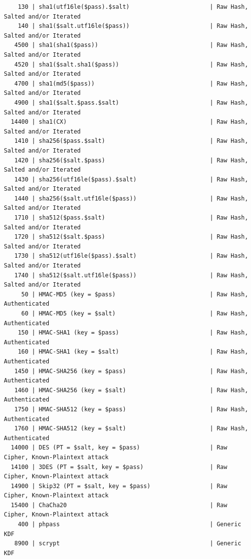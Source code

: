 \documentclass{article}
\begin{document}
\begin{lstlisting}
    130 | sha1(utf16le($pass).$salt)                       | Raw Hash, Salted and/or Iterated
    140 | sha1($salt.utf16le($pass))                       | Raw Hash, Salted and/or Iterated
   4500 | sha1(sha1($pass))                                | Raw Hash, Salted and/or Iterated
   4520 | sha1($salt.sha1($pass))                          | Raw Hash, Salted and/or Iterated
   4700 | sha1(md5($pass))                                 | Raw Hash, Salted and/or Iterated
   4900 | sha1($salt.$pass.$salt)                          | Raw Hash, Salted and/or Iterated
  14400 | sha1(CX)                                         | Raw Hash, Salted and/or Iterated
   1410 | sha256($pass.$salt)                              | Raw Hash, Salted and/or Iterated
   1420 | sha256($salt.$pass)                              | Raw Hash, Salted and/or Iterated
   1430 | sha256(utf16le($pass).$salt)                     | Raw Hash, Salted and/or Iterated
   1440 | sha256($salt.utf16le($pass))                     | Raw Hash, Salted and/or Iterated
   1710 | sha512($pass.$salt)                              | Raw Hash, Salted and/or Iterated
   1720 | sha512($salt.$pass)                              | Raw Hash, Salted and/or Iterated
   1730 | sha512(utf16le($pass).$salt)                     | Raw Hash, Salted and/or Iterated
   1740 | sha512($salt.utf16le($pass))                     | Raw Hash, Salted and/or Iterated
     50 | HMAC-MD5 (key = $pass)                           | Raw Hash, Authenticated
     60 | HMAC-MD5 (key = $salt)                           | Raw Hash, Authenticated
    150 | HMAC-SHA1 (key = $pass)                          | Raw Hash, Authenticated
    160 | HMAC-SHA1 (key = $salt)                          | Raw Hash, Authenticated
   1450 | HMAC-SHA256 (key = $pass)                        | Raw Hash, Authenticated
   1460 | HMAC-SHA256 (key = $salt)                        | Raw Hash, Authenticated
   1750 | HMAC-SHA512 (key = $pass)                        | Raw Hash, Authenticated
   1760 | HMAC-SHA512 (key = $salt)                        | Raw Hash, Authenticated
  14000 | DES (PT = $salt, key = $pass)                    | Raw Cipher, Known-Plaintext attack
  14100 | 3DES (PT = $salt, key = $pass)                   | Raw Cipher, Known-Plaintext attack
  14900 | Skip32 (PT = $salt, key = $pass)                 | Raw Cipher, Known-Plaintext attack
  15400 | ChaCha20                                         | Raw Cipher, Known-Plaintext attack
    400 | phpass                                           | Generic KDF
   8900 | scrypt                                           | Generic KDF

\end{lstlisting}
\end{document}

